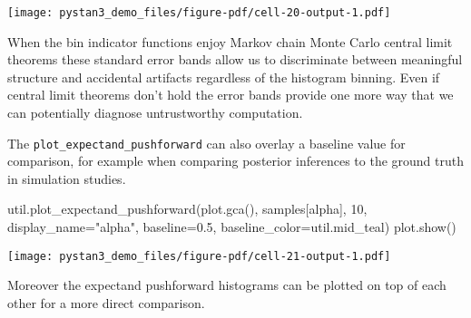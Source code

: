 \documentclass[
  letterpaper,
  DIV=11,
  numbers=noendperiod]{scrartcl}
\newenvironment{Shaded}{\begin{snugshade}}{\end{snugshade}}
\newcommand{\DecValTok}[1]{\textcolor[rgb]{0.68,0.00,0.00}{#1}}
\newcommand{\FloatTok}[1]{\textcolor[rgb]{0.68,0.00,0.00}{#1}}
\newcommand{\NormalTok}[1]{\textcolor[rgb]{0.00,0.23,0.31}{#1}}
\newcommand{\OperatorTok}[1]{\textcolor[rgb]{0.37,0.37,0.37}{#1}}
\newcommand{\StringTok}[1]{\textcolor[rgb]{0.13,0.47,0.30}{#1}}
\begin{document}
\texttt{[image: pystan3\_demo\_files/figure-pdf/cell-20-output-1.pdf]}

When the bin indicator functions enjoy Markov chain Monte Carlo central
limit theorems these standard error bands allow us to discriminate
between meaningful structure and accidental artifacts regardless of the
histogram binning. Even if central limit theorems don't hold the error
bands provide one more way that we can potentially diagnose
untrustworthy computation.

The \texttt{plot\_expectand\_pushforward} can also overlay a baseline
value for comparison, for example when comparing posterior inferences to
the ground truth in simulation studies.

\begin{Shaded}
\begin{Highlighting}[]
\NormalTok{util.plot\_expectand\_pushforward(plot.gca(), samples[}\StringTok{\textquotesingle{}alpha\textquotesingle{}}\NormalTok{],}
                                \DecValTok{10}\NormalTok{, display\_name}\OperatorTok{=}\StringTok{"alpha"}\NormalTok{,}
\NormalTok{                                baseline}\OperatorTok{=}\FloatTok{0.5}\NormalTok{,}
\NormalTok{                                baseline\_color}\OperatorTok{=}\NormalTok{util.mid\_teal)}
\NormalTok{plot.show()}
\end{Highlighting}
\end{Shaded}

\texttt{[image: pystan3\_demo\_files/figure-pdf/cell-21-output-1.pdf]}

Moreover the expectand pushforward histograms can be plotted on top of
each other for a more direct comparison.
\end{document}
